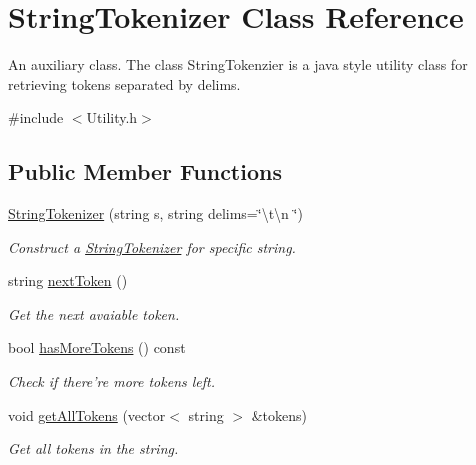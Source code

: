 \hypertarget{classStringTokenizer}{\section{String\-Tokenizer Class Reference}
\label{classStringTokenizer}
}


An auxiliary class. The class String\-Tokenzier is a java style utility class for retrieving tokens separated by delims.  




{\ttfamily \#include $<$Utility.\-h$>$}

\subsection*{Public Member Functions}
\begin{DoxyCompactItemize}
\item 
\hyperlink{classStringTokenizer_a04097390a7c9cddce20824648c17bb52}{String\-Tokenizer} (string s, string delims=\char`\"{}\textbackslash{}t\textbackslash{}n \char`\"{})
\begin{DoxyCompactList}\small\item\em Construct a \hyperlink{classStringTokenizer}{String\-Tokenizer} for specific string. \end{DoxyCompactList}\item 
string \hyperlink{classStringTokenizer_a9c95e7412890819dae3e20f23aaa76be}{next\-Token} ()
\begin{DoxyCompactList}\small\item\em Get the next avaiable token. \end{DoxyCompactList}\item 
bool \hyperlink{classStringTokenizer_aae2b0616e31bf6342f3417677f2a2c83}{has\-More\-Tokens} () const 
\begin{DoxyCompactList}\small\item\em Check if there're more tokens left. \end{DoxyCompactList}\item 
void \hyperlink{classStringTokenizer_a8b60b7ec2a45608e2909c872cf4a462a}{get\-All\-Tokens} (vector$<$ string $>$ \&tokens)
\begin{DoxyCompactList}\small\item\em Get all tokens in the string. \end{DoxyCompactList}\end{DoxyCompactItemize}
